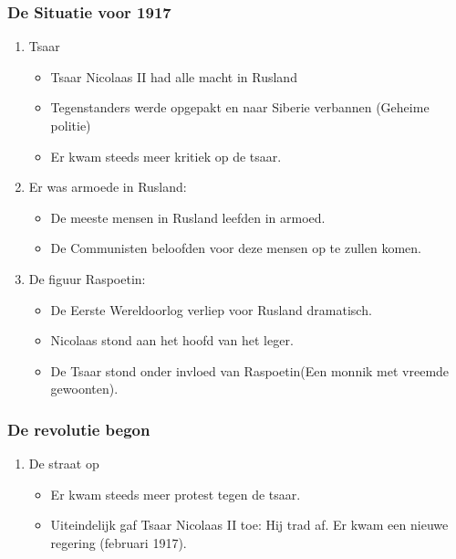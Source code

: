 \documentclass{article}
\begin{document}
\subsubsection{De Situatie voor 1917}
\begin{enumerate}
    \item Tsaar
    \begin{itemize}
        \item Tsaar Nicolaas II had alle macht in Rusland
        \item Tegenstanders werde opgepakt en naar Siberie verbannen (Geheime politie)
        \item Er kwam steeds meer kritiek op de tsaar.
    \end{itemize}
    \item Er was armoede in Rusland:
    \begin{itemize}
        \item De meeste mensen in Rusland leefden in armoed.
        \item De Communisten beloofden voor deze mensen op te zullen komen.
    \end{itemize}
    \item De figuur Raspoetin:
    \begin{itemize}
        \item De Eerste Wereldoorlog verliep voor Rusland dramatisch.
        \item Nicolaas stond aan het hoofd van het leger.
        \item De Tsaar stond onder invloed van Raspoetin(Een monnik met vreemde gewoonten).
    \end{itemize}
\end{enumerate}
\subsubsection{De revolutie begon}
\begin{enumerate}
    \item De straat op
    \begin{itemize}
        \item Er kwam steeds meer protest tegen de tsaar.
        \item Uiteindelijk gaf Tsaar Nicolaas II toe: Hij trad af. Er kwam een nieuwe regering (februari 1917).
    \end{itemize}
\end{enumerate}
\end{document}
